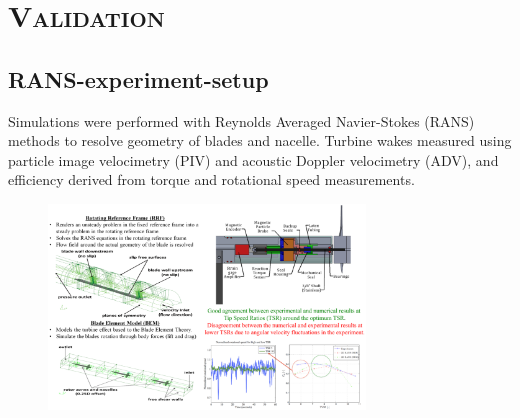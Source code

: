 \documentclass[xcolor=x11names,compress]{beamer}
\newcommand{\customfootcite}[1]{\footnote{\citeauthor{#1}, \citetitle{#1}, \citeyear{#1}}}
\begin{document}
\section{\scshape Validation}

\subsection{RANS-experiment-setup}
	
	\begin{frame}{}

		\scriptsize Simulations were performed with Reynolds Averaged Navier-Stokes (RANS) methods 
		to resolve geometry of blades and nacelle. Turbine wakes measured using
		particle image velocimetry (PIV) and acoustic Doppler velocimetry (ADV), and efficiency derived from
		torque and rotational speed measurements. 

		\vspace{-5pt}

		\begin{figure}[p]
		    \centering
		    \includegraphics[width=0.75\textwidth]{figures/validation-RANS-experiment-setup.png}
		\end{figure}

	\end{frame}
\end{document}

